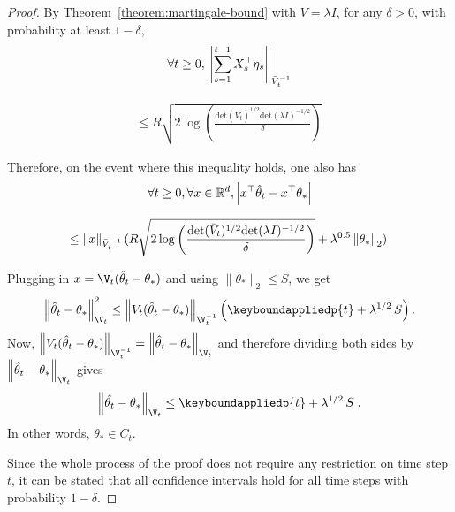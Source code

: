 \begin{proof}
By Theorem~\ref{theorem:martingale-bound} with $V=\lambda I$, for any $\delta > 0$, with probability at least $1-\delta$,
 \begin{align*}
  \forall t \geq 0, \left\|\sum_{s=1}^{t-1}{X_s^\top \mathbf{\eta}_s}\right\|_{\bar{V}_t^{-1}}
  \end{align*}

  \begin{align*}
  \leq R \sqrt{2 \log\left(\frac{\mathrm{det}(\bar{V}_t)^{1/2} \mathrm{det}(\lambda I)^{-1/2} }{\delta}\right)}\,
\end{align*}

Therefore, on the event where this inequality holds, one also has
\begin{align*}
  \forall t \ge 0, \forall x \in \mathbb{R}^d, \left|x^\top \hat{\mathbf{\theta}}_t - x^\top \theta_*\right|
  \end{align*}

  \begin{align*}
  \leq \left\|x\right\|_{\bar{V}_t^{-1}}(R \sqrt{2 \log\left(\frac{\mathrm{det}(\bar{V}_t)^{1/2} \mathrm{det}(\lambda I)^{-1/2} }{\delta}\right)} + \lambda^{0.5} \left\|\theta_*\right\|_2) \,
\end{align*}

Plugging in  $x = \V_{t}(\hat{\theta}_t - \theta_*)$ and using $\|\theta_*\|_2 \le S$, we get
\begin{equation}
\label{eq:cs1}
\norm{\hat{\theta}_t -  \theta_*}_{\V_{t}}^2
\le
\norm{V_{t}(\hat{\theta}_t - \theta_*)}_{\V_{t}^{-1}} \left( \keyboundappliedp{t} + \lambda^{1/2}\, S\right).
\end{equation}
Now, $\norm{V_{t}(\hat{\theta}_t - \theta_*)}_{\V_{t}^{-1}} = \norm{\hat{\theta}_t -  \theta_*}_{\V_{t}}$ and therefore
dividing both sides by $\norm{\hat{\theta}_t -  \theta_*}_{\V_{t}}$ gives
$$
\norm{\hat{\theta_t} -  \theta_*}_{\V_{t}} \le \keyboundappliedp{t} + \lambda^{1/2}\, S \; .
$$
In other words, $\theta_* \in C_t$.

Since the whole process of the proof does not require any restriction on time step $t$, it can be stated that
all confidence intervals hold for all time steps with probability $1-\delta$.
\end{proof}

